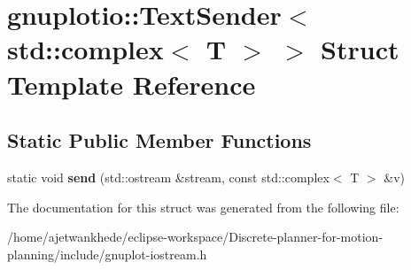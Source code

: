 \hypertarget{structgnuplotio_1_1TextSender_3_01std_1_1complex_3_01T_01_4_01_4}{}\section{gnuplotio\+:\+:Text\+Sender$<$ std\+:\+:complex$<$ T $>$ $>$ Struct Template Reference}
\label{structgnuplotio_1_1TextSender_3_01std_1_1complex_3_01T_01_4_01_4}
\subsection*{Static Public Member Functions}
\begin{DoxyCompactItemize}
\item 
\mbox{\label{structgnuplotio_1_1TextSender_3_01std_1_1complex_3_01T_01_4_01_4_ad524aa3e121d0ebd66346d77f1fd5a1c}} 
static void {\bfseries send} (std\+::ostream \&stream, const std\+::complex$<$ T $>$ \&v)
\end{DoxyCompactItemize}


The documentation for this struct was generated from the following file\+:\begin{DoxyCompactItemize}
\item 
/home/ajetwankhede/eclipse-\/workspace/\+Discrete-\/planner-\/for-\/motion-\/planning/include/gnuplot-\/iostream.\+h\end{DoxyCompactItemize}
